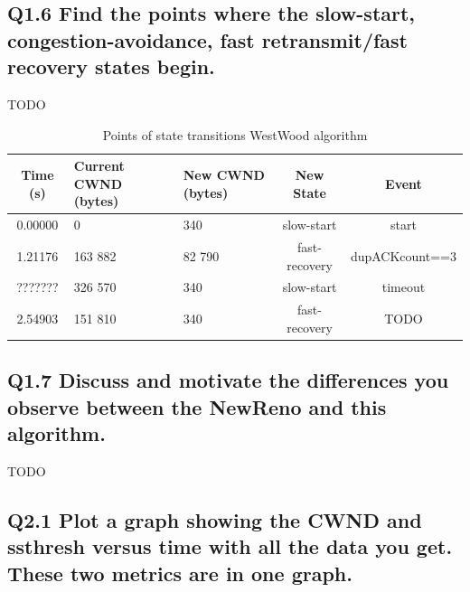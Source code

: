 \documentclass{article}
\begin{document}
\subsection{Q1.6 Find the points where the slow-start, congestion-avoidance, fast retransmit/fast recovery states begin.}

TODO

\begin{table}[H]
\center
\caption{Points of state transitions WestWood algorithm}
\label{table:results2}
\begin{tabular}{|c|p{25mm}|p{20mm}|c|c|}
\hline Time (s)    & Current CWND (bytes)    & New CWND (bytes)    & New State             & Event            \\
\hline 0.00000     & 0                       & 340                 & slow-start            & start            \\ 
\hline 1.21176     & 163 882                 & 82 790              & fast-recovery         & dupACKcount==3   \\ 
\hline ???????     & 326 570                 & 340                 & slow-start            & timeout          \\ 
\hline 2.54903     & 151 810                 & 340                 & fast-recovery         & TODO \\ 
\hline  
\end{tabular} 
\end{table}


\subsection{Q1.7 Discuss and motivate the differences you observe between the NewReno and this algorithm.}

TODO

\subsection{Q2.1 Plot a graph showing the CWND and ssthresh versus time with all the data you get. These two metrics are in one graph.}\label{sec:q21}
\end{document}
